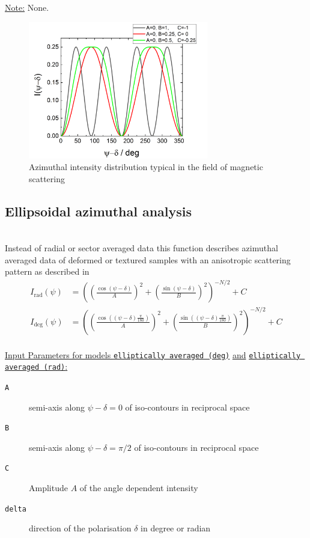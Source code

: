 \noindent \uline{Note:}
None.


\begin{figure}[htb]
\begin{center}
\includegraphics[width=0.7\textwidth]{../images/form_factor/azimuthal/sin2sin4.png}
\end{center}
\caption{Azimuthal intensity distribution typical in the field of magnetic scattering}
\label{fig:IQsin2sin4}
\end{figure}

\newpage
\subsection{Ellipsoidal azimuthal analysis} ~\\
Instead of radial or sector averaged data this function describes azimuthal averaged data of deformed or textured samples with an anisotropic scattering pattern as described in
\cite{Summerfield1983,Mildner1983,Reynolds1984,Hammouda1986,Hammouda1986a,Saraf1989,Svetogorsky1990,Gu2016,Gu2018}
\begin{align}
I_\mathrm{rad}(\psi) &= \left(\left(\frac{\cos(\psi-\delta)}{A}\right)^2 + \left(\frac{\sin(\psi-\delta)}{B}\right)^2\right)^{-N/2} +C\\
I_\mathrm{deg}(\psi) &= \left(\left(\frac{\cos\left((\psi-\delta)\frac{\pi}{180}\right)}{A}\right)^2 + \left(\frac{\sin\left((\psi-\delta)\frac{\pi}{180}\right)}{B}\right)^2\right)^{-N/2}+C
\end{align}
\hspace{1pt}\\
\uline{Input Parameters for models \texttt{elliptically averaged (deg)}} \uline{and} \uline{\texttt{elliptically averaged (rad)}:}\\
\begin{description}
\item[\texttt{A}] semi-axis along $\psi-\delta=0$ of iso-contours in reciprocal space
\item[\texttt{B}] semi-axis along $\psi-\delta=\pi/2$ of iso-contours in reciprocal space
\item[\texttt{C}] Amplitude $A$ of the angle dependent intensity
\item[\texttt{delta}] direction of the polarisation $\delta$ in degree or radian
\end{description}

